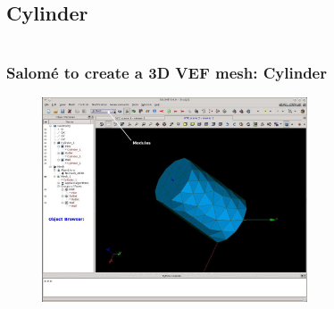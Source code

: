 \documentclass[10pt, hyperref={unicode=true,pdfusetitle, bookmarks=true,bookmarksnumbered=false,bookmarksopen=false, breaklinks=false,pdfborder={0 0 1},backref=true,colorlinks=true,linkcolor=darkblue,pageanchor}]{beamer}
\begin{document}
\subsection{Cylinder}
\begin{frame}
\begin{columns}[c] 
\tableofcontents[sections={1-9},currentsection, currentsubsection]
\tableofcontents[sections={10-16},currentsection, currentsubsection]
\end{columns}
\end{frame}
\begin{frame}
\frametitle{Salom\'e to create a 3D VEF mesh: Cylinder}

\begin{figure}
\includegraphics[width=0.7\textwidth]{PICTURES/salome1_2.jpg}
\end{figure}

\end{frame}
\end{document}
